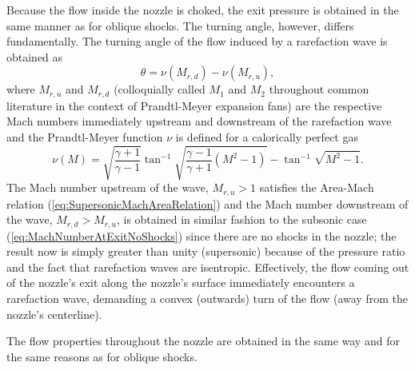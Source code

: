 \documentclass[11pt,dvipsnames]{thesis}
\begin{document}
Because the flow inside the nozzle is choked, the exit pressure is obtained in the same manner as for oblique shocks. The turning angle, however, differs fundamentally. The turning angle of the flow induced by a rarefaction wave is obtained as
\begin{equation}
\theta = \nu(M_{r,d}) - \nu(M_{r,u}), \label{eq:PropulsionPrandtlMeyer}
\end{equation}
where $M_{r,u}$ and $M_{r,d}$ (colloquially called $M_1$ and $M_2$ throughout common literature in the context of Prandtl-Meyer expansion fans) are the respective Mach numbers immediately upstream and downstream of the rarefaction wave and the Prandtl-Meyer function $\nu$ is defined for a calorically perfect gas
\begin{equation}
\nu(M) = \sqrt{\frac{\gamma + 1}{\gamma - 1}} \tan^{-1} \sqrt{\frac{\gamma - 1}{\gamma + 1} (M^2 - 1)} - \tan^{-1} \sqrt{M^2 - 1}. \label{eq:PropulsionPrandtlMeyerFunction}
\end{equation}
The Mach number upstream of the wave, $M_{r,u} > 1$ satisfies the Area-Mach relation (\ref{eq:SupersonicMachAreaRelation}) and the Mach number downstream of the wave, $M_{r,d} > M_{r,u}$, is obtained in similar fashion to the subsonic case (\ref{eq:MachNumberAtExitNoShocks}) since there are no shocks in the nozzle; the result now is simply greater than unity (supersonic) because of the pressure ratio and the fact that rarefaction waves are isentropic.
Effectively, the flow coming out of the nozzle's exit along the nozzle's surface immediately encounters a rarefaction wave, demanding a convex (outwards) turn of the flow (away from the nozzle's centerline).

The flow properties throughout the nozzle are obtained in the same way and for the same reasons as for oblique shocks.
\end{document}
